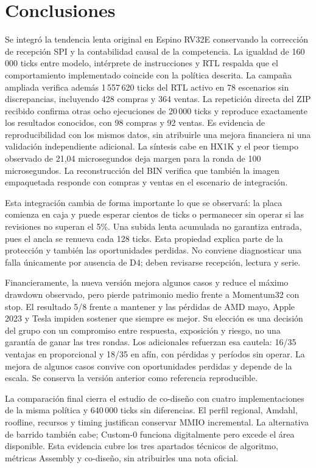 \documentclass[11pt,a4paper]{article}
\begin{document}
\section{Conclusiones}
Se integró la tendencia lenta original en Espino RV32E conservando la corrección
de recepción SPI y la contabilidad causal de la competencia. La igualdad de
160\,000 ticks entre modelo, intérprete de instrucciones y RTL respalda que el comportamiento
implementado coincide con la política descrita. La campaña ampliada verifica
además 1\,557\,620 ticks del RTL activo en 78 escenarios sin discrepancias,
incluyendo 428 compras y 364 ventas.
La repetición directa del ZIP recibido confirma otras ocho ejecuciones de
20\,000 ticks y reproduce exactamente los resultados conocidos, con 98 compras
y 92 ventas. Es evidencia de reproducibilidad con los mismos datos, sin
atribuirle una mejora financiera ni una validación independiente adicional.
La síntesis cabe en HX1K y el
peor tiempo observado de 21,04 microsegundos deja margen para la ronda de 100 microsegundos. La
reconstrucción del BIN verifica que también la imagen empaquetada responde con
compras y ventas en el escenario de integración.

Esta integración cambia de forma importante lo que se observará: la placa
comienza en caja y puede esperar cientos de ticks o permanecer sin operar si
las revisiones no superan el 5\%. Una subida lenta acumulada no garantiza entrada,
pues el ancla se renueva cada 128 ticks. Esta propiedad explica parte de la
protección y también las oportunidades perdidas. No conviene diagnosticar una
falla únicamente por ausencia de D4; deben revisarse recepción, lectura y serie.

Financieramente, la nueva versión mejora algunos casos y reduce el máximo
drawdown observado, pero pierde patrimonio medio frente a Momentum32 con stop.
El resultado 5/8 frente a mantener y las pérdidas de AMD mayo, Apple 2023 y
Tesla impiden sostener que siempre es mejor. Su elección es una decisión del
grupo con un compromiso entre respuesta, exposición y riesgo, no una garantía
de ganar las tres rondas. Los adicionales refuerzan esa cautela: 16/35 ventajas
en proporcional y 18/35 en afín, con pérdidas y períodos sin operar. La mejora
de algunos casos convive con oportunidades perdidas y depende de la escala.
Se conserva la versión anterior como referencia reproducible.

La comparación final cierra el estudio de co-diseño con cuatro implementaciones
de la misma política y 640\,000 ticks sin diferencias. El perfil regional,
Amdahl, roofline, recursos y timing justifican conservar MMIO incremental.
La alternativa de barrido también cabe; Custom-0 funciona digitalmente pero
excede el área disponible. Esta evidencia cubre los tres apartados técnicos
de algoritmo, métricas Assembly y co-diseño, sin atribuirles una nota oficial.
\end{document}
